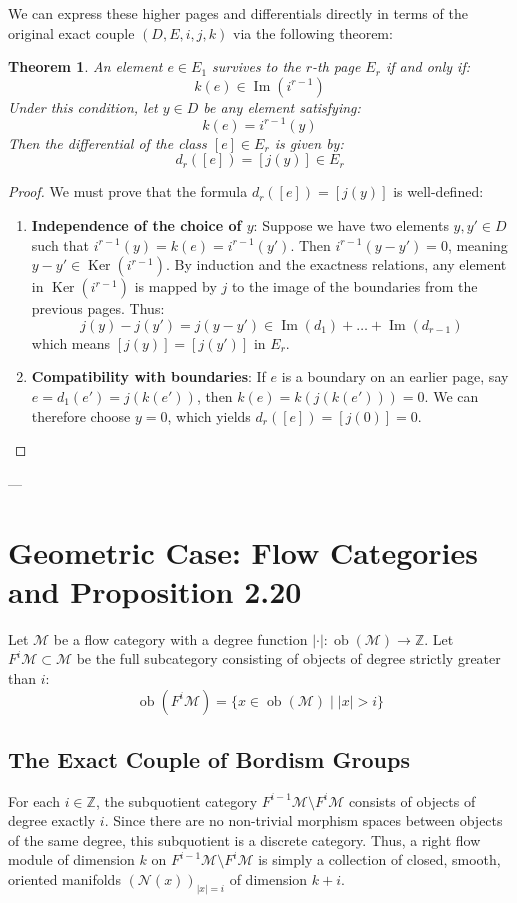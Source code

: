 \documentclass[a4paper,11pt]{article}
\theoremstyle{plain}
\newtheorem{thm}{Theorem}[section]
\theoremstyle{definition}
\theoremstyle{remark}
\newcommand{\bbZ}{\mathbb{Z}}
\newcommand{\flowM}{\mathcal{M}}
\newcommand{\Image}{\operatorname{Im}}
\newcommand{\ob}{\operatorname{ob}}
\begin{document}
We can express these higher pages and differentials directly in terms of the original exact couple $(D, E, i, j, k)$ via the following theorem:

\begin{thm}\label{thm:algebraic_diff}
An element $e \in E_1$ survives to the $r$-th page $E_r$ if and only if:
\[
k(e) \in \Image(i^{r-1})
\]
Under this condition, let $y \in D$ be any element satisfying:
\[
k(e) = i^{r-1}(y)
\]
Then the differential of the class $[e] \in E_r$ is given by:
\[
d_r([e]) = [j(y)] \in E_r
\]
\end{thm}

\begin{proof}
We must prove that the formula $d_r([e]) = [j(y)]$ is well-defined:
\begin{enumerate}
    \item \textbf{Independence of the choice of $y$}: Suppose we have two elements $y, y' \in D$ such that $i^{r-1}(y) = k(e) = i^{r-1}(y')$. Then $i^{r-1}(y - y') = 0$, meaning $y - y' \in \operatorname{Ker}(i^{r-1})$. By induction and the exactness relations, any element in $\operatorname{Ker}(i^{r-1})$ is mapped by $j$ to the image of the boundaries from the previous pages. Thus:
    \[
    j(y) - j(y') = j(y - y') \in \Image(d_1) + \dots + \Image(d_{r-1})
    \]
    which means $[j(y)] = [j(y')]$ in $E_r$.
    \item \textbf{Compatibility with boundaries}: If $e$ is a boundary on an earlier page, say $e = d_1(e') = j(k(e'))$, then $k(e) = k(j(k(e'))) = 0$. We can therefore choose $y = 0$, which yields $d_r([e]) = [j(0)] = 0$.
\end{enumerate}
\end{proof}

---

\section{Geometric Case: Flow Categories and Proposition 2.20}

Let $\flowM$ be a flow category with a degree function $|\cdot| \colon \ob(\flowM) \to \bbZ$. Let $F^i \flowM \subset \flowM$ be the full subcategory consisting of objects of degree strictly greater than $i$:
\[
\ob(F^i \flowM) = \{x \in \ob(\flowM) \mid |x| > i\}
\]

\subsection{The Exact Couple of Bordism Groups}
For each $i \in \bbZ$, the subquotient category $F^{i-1}\flowM \setminus F^i \flowM$ consists of objects of degree exactly $i$. Since there are no non-trivial morphism spaces between objects of the same degree, this subquotient is a discrete category. Thus, a right flow module of dimension $k$ on $F^{i-1}\flowM \setminus F^i \flowM$ is simply a collection of closed, smooth, oriented manifolds $(\mathcal{N}(x))_{|x|=i}$ of dimension $k+i$.
\end{document}
